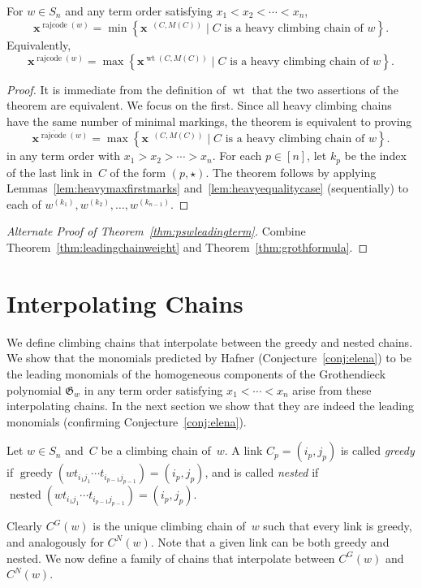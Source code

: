 \documentclass[ALCO]{cedram}
\DeclareMathOperator{\nested}{\mathrm{nested}}
\DeclareMathOperator{\greedy}{\mathrm{greedy}}
\DeclareMathOperator{\wt}{\mathrm{wt}}
\DeclareMathOperator{\dwt}{\overline{\mathrm{wt}}}
\DeclareMathOperator{\rr}{\mathrm{rajcode}}
\newcommand{\orr}{\overline{\rr}}
\newcommand{\CG}{C^G}
\newcommand{\CN}{C^N}
\begin{document}
\begin{theorem}
	\label{thm:leadingchainweight}
	For $w\in S_n$ and any term order satisfying $x_1<x_2<\cdots<x_n$,
	\[\bm{x}^{\orr(w)} = \min \left\{\bm{x}^{\dwt(C,M(C))} \mid C \mbox{ is a heavy climbing chain of } w \right\}. \] 
	Equivalently,
	\[\bm{x}^{\rr(w)} = \max \left\{\bm{x}^{\wt(C,M(C))} \mid C \mbox{ is a heavy climbing chain of } w \right\}. \] 
\end{theorem}
\begin{proof}
	It is immediate from the definition of $\wt$ that the two assertions of the theorem are equivalent. We focus on the first. Since all heavy climbing chains have the same number of minimal markings, the theorem is equivalent to proving 
	\[\bm{x}^{\orr(w)} = \max \left\{\bm{x}^{\dwt(C,M(C))} \mid C \mbox{ is a heavy climbing chain of } w \right\}. \] 
	in any term order with $x_1>x_2>\cdots>x_n$. 
	For each $p\in[n]$, let $k_p$ be the index of the last link in~$C$ of the form $(p,\star)$. The theorem follows by applying Lemmas~\ref{lem:heavymaxfirstmarks} and~\ref{lem:heavyequalitycase} (sequentially) to each of $w^{(k_1)},w^{(k_2)},\ldots,w^{(k_{n-1})}$.
\end{proof}

\begin{proof}[Alternate Proof of {Theorem~\ref{thm:pswleadingterm}}]
Combine Theorem~\ref{thm:leadingchainweight} and Theorem~\ref{thm:grothformula}.
\end{proof}

\section{Interpolating Chains}
\label{sec:inter}

We define climbing chains that interpolate between the greedy and nested chains. We show that the monomials predicted by Hafner (Conjecture~\ref{conj:elena}) to be the leading monomials of the homogeneous components of the Grothendieck polynomial $\mathfrak{G}_w$ in any term order satisfying $x_1<\cdots<x_n$ arise from these interpolating chains. In the next section we show that they are indeed the leading monomials (confirming Conjecture~\ref{conj:elena}).

\begin{definition}
	Let $w\in S_n$ and~$C$ be a climbing chain of~$w$. 
	A link $C_p=(i_p,j_p)$ is called \emph{greedy} if $\greedy(wt_{i_1j_1}\cdots t_{i_{p-1}j_{p-1}}) = (i_p,j_p)$, and is called \emph{nested} if $\nested(wt_{i_1j_1}\cdots t_{i_{p-1}j_{p-1}}) = (i_p,j_p)$.
\end{definition}
Clearly $\CG(w)$ is the unique climbing chain of~$w$ such that every link is greedy, and analogously for $\CN(w)$. Note that a given link can be both greedy and nested. We now define a family of chains that interpolate between $\CG(w)$ and $\CN(w)$.
\end{document}
